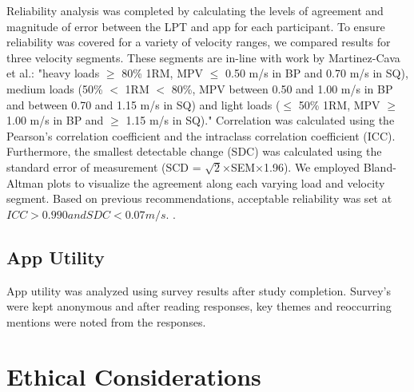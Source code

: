 \documentclass[10pt,twocolumn]{article}
\begin{document}
Reliability analysis was completed by calculating the levels of agreement and magnitude of error between the LPT and app for each participant.
To ensure reliability was covered for a variety of velocity ranges, we compared results for three velocity segments.
These segments are in-line with work by Martinez-Cava et al.\cite{Martinez-Cava2020}: "heavy loads $\geq$ 80\% 1RM, MPV $\leq$ 0.50 m/s in BP and 0.70 m/s in SQ), medium loads (50\% $<$ 1RM $<$ 80\%, MPV between 0.50 and 1.00 m/s in BP and between 0.70 and 1.15 m/s in SQ) and light loads ($\leq$ 50\% 1RM, MPV $\geq$ 1.00 m/s in BP and $\geq$ 1.15 m/s in SQ)."
Correlation was calculated using the Pearson's correlation coefficient and  the intraclass correlation coefficient (ICC).
Furthermore, the smallest detectable change (SDC) was calculated using the standard error of measurement (SCD = $\sqrt{2}$×SEM×1.96).
We employed Bland-Altman plots to visualize the agreement along each varying load and velocity segment.
Based on previous recommendations, acceptable reliability was set at $ICC > 0.990 and SDC < 0.07 m/s$. \cite{Martinez-Cava2020}. 

\subsection{App Utility}
App utility was analyzed using survey results after study completion.
Survey's were kept anonymous and after reading responses, key themes and reoccurring mentions were noted from the responses.


\section{Ethical Considerations}

\printbibliography 
\end{document}
